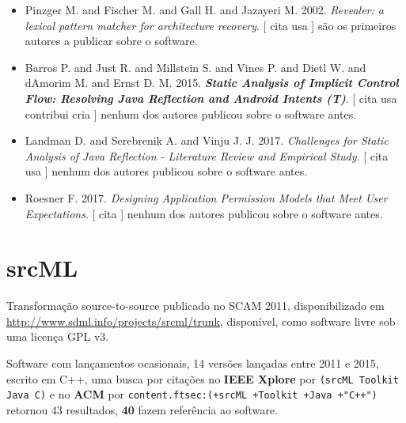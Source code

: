 \begin{itemize}
\item Pinzger M. and Fischer M. and Gall H. and Jazayeri M.
      2002.
        \textit{ Revealer: a lexical pattern matcher for architecture recovery}.
      [
          cita
          usa
      ]
são os primeiros autores a publicar sobre o software.
\item Barros P. and Just R. and Millstein S. and Vines P. and Dietl W. and dAmorim M. and Ernst D. M.
      2015.
        \textbf{\textit{ Static Analysis of Implicit Control Flow: Resolving Java Reflection and Android Intents (T)}}.
      [
          cita
          usa
          contribui
          cria
      ]
nenhum dos autores publicou sobre o software antes.
\item Landman D. and Serebrenik A. and Vinju J. J.
      2017.
        \textit{ Challenges for Static Analysis of Java Reflection - Literature Review and Empirical Study}.
      [
          cita
          usa
      ]
nenhum dos autores publicou sobre o software antes.
\item Roesner F.
      2017.
        \textit{ Designing Application Permission Models that Meet User Expectations}.
      [
          cita
      ]
nenhum dos autores publicou sobre o software antes.
\end{itemize}
\section{srcML}

Transformação source-to-source
publicado no SCAM 2011,
disponibilizado em \url{http://www.sdml.info/projects/srcml/trunk},
disponível,
como software livre
sob uma licença GPL v3.

Software com lançamentos ocasionais,
14 versões lançadas
entre 2011 e 2015,
escrito em C++,
uma busca por citações no {\bf IEEE Xplore} por
\texttt{(srcML Toolkit Java C)}
e no {\bf ACM} por
\texttt{content.ftsec:(+srcML +Toolkit +Java +"C++")}
retornou
43 resultados,
{\bf 40} fazem referência ao software.


